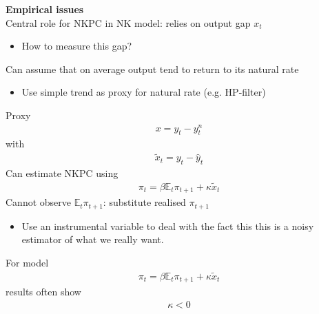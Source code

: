 \documentclass{beamer}
\begin{document}
\begin{frame}
  \textbf{Empirical issues}\\ \medskip
  Central role for NKPC in NK model: relies on output gap $x_t$
  \begin{itemize}
    \item How to measure this gap?
  \end{itemize}
  \medskip
  Can assume that on average output tend to return to its natural rate
 \begin{itemize}
   \item Use simple trend as proxy for natural rate (e.g. HP-filter)
 \end{itemize}
\end{frame}

\begin{frame}
 Proxy
 \begin{align}
  x=y_t-y_t^n
 \end{align}
 with
\begin{align}
  \tilde{x}_t=y_t-\hat{y}_t
\end{align}
\medskip
Can estimate NKPC using 
\begin{align}
  \pi_t = \beta \mathbb{E}_t \pi_{t+1} + \kappa\tilde{x}_t
\end{align}
\medskip
Cannot observe $\mathbb{E}_t \pi_{t+1}$: substitute realised $\pi_{t+1}$ 
\begin{itemize}
  \item Use an instrumental variable to deal with the fact this this is a noisy estimator of what we really want.
\end{itemize}
\end{frame}

\begin{frame} 
  For model
  \begin{align*}
    \pi_t = \beta \mathbb{E}_t\pi_{t+1} + \kappa \tilde{x}_t
  \end{align*}
  results often show 
  \begin{align*}
    \kappa<0
  \end{align*}  
\end{frame}
\end{document}

